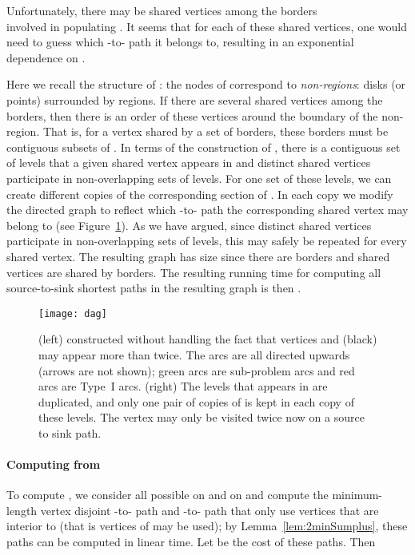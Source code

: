 \documentclass[11pt,twoside]{article}
\begin{document}
Unfortunately, there may be  shared vertices among the borders \\  involved in populating .
  It seems that for each of these  shared vertices, one would need to guess which -to- path it belongs to, resulting in an exponential dependence on . 

Here we recall the structure of : the nodes of  correspond to {\em non-regions}: disks (or points) surrounded by regions.  If there are several shared vertices among the borders, then there is an order of these vertices around the boundary of the non-region.  That is, for a vertex shared by a set of borders, these borders must be contiguous subsets of .  In terms of the construction of , there is a contiguous set of levels that a given shared vertex appears in and distinct shared vertices participate in non-overlapping sets of levels.  For one set of these levels, we can create different copies of the corresponding section of .  In each copy we modify the directed graph to reflect which -to- path the corresponding shared vertex may belong to (see Figure~\ref{fig:copies}).  As we have argued, since distinct shared vertices participate in non-overlapping sets of levels, this may safely be repeated for every shared vertex.  The resulting graph has size  since there are  borders and shared vertices are shared by borders.  The resulting running time for computing all source-to-sink shortest paths in the resulting graph is then .

\begin{figure}[ht]
  \centering
  \texttt{[image: dag]}
\caption{(left)  constructed without handling the fact that vertices  and  (black) may appear more than twice.  The arcs are all directed upwards (arrows are not shown); green arcs are sub-problem arcs and red arcs are Type~I arcs. (right) The levels that  appears in are duplicated, and only one pair of copies of  is kept in each copy of these levels. The vertex  may only be visited twice now on a source to sink path.}
\label{fig:copies}
\end{figure}

\paragraph{Computing  from }
To compute , we consider all possible  on  and  on  and compute the minimum-length vertex disjoint -to- path and -to- path that only use vertices that are interior to  (that is vertices of  may be used); by Lemma~\ref{lem:2minSumplus}, these paths can be computed in linear time.  Let  be the cost of these paths.  Then
\end{document}

